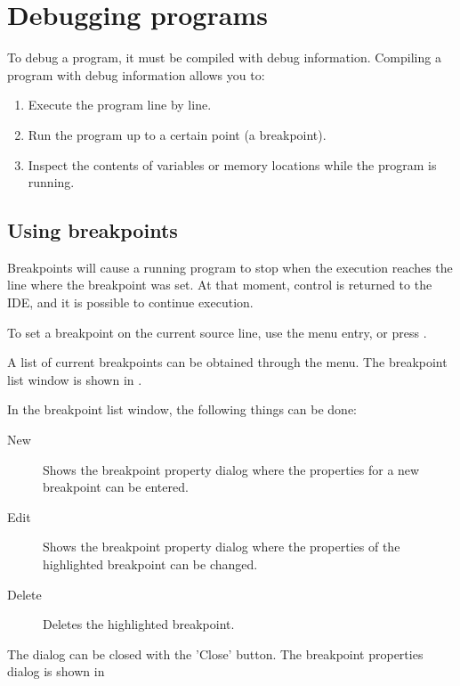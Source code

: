 \section{Debugging programs}
\label{se:debugging}
To debug a program, it must be compiled with debug information. Compiling a
program with debug information allows you to:
\begin{enumerate}
\item Execute the program line by line.
\item Run the program up to a certain point (a breakpoint).
\item Inspect the contents of variables or memory locations while the
program is running.
\end{enumerate}
%
%
\subsection{Using breakpoints}
Breakpoints will cause a running program to stop when the execution
reaches the line where the breakpoint was set. At that moment, control
is returned to the IDE, and it is possible to continue execution.

To set a breakpoint on the current source line, use the
 menu entry, or press .

A list of current breakpoints can be obtained through the
 menu. The breakpoint list window
is shown in .


In the breakpoint list window, the following things can be done:
\begin{description}
\item[New] Shows the breakpoint property dialog where the properties
for a new breakpoint can be entered.
\item[Edit] Shows the breakpoint property dialog where the properties of
the highlighted breakpoint can be changed.
\item[Delete] Deletes the highlighted breakpoint.
\end{description}
The dialog can be closed with the 'Close' button.
The breakpoint properties dialog is shown in 


